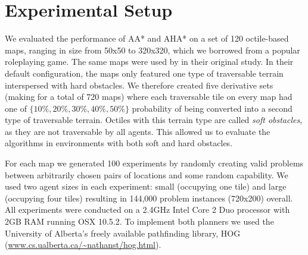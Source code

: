 \section{Experimental Setup}
We evaluated the performance of AA* and AHA* on a set of 120 octile-based maps, ranging in size from 50x50 to 320x320, which we borrowed from a popular roleplaying game.
The same maps were used by \cite{botea04} in their original study.
In their default configuration, the maps only featured one type of traversable terrain interspersed with hard obstacles. 
We therefore created five derivative sets (making for a total of 720 maps) where each traversable tile on every map had one of $\lbrace 10\%, 20\%, 30\%, 40\%, 50\% \rbrace$ probability of being converted into a second type of traversable terrain. Octiles with this terrain type are called \emph{soft obstacles}, as they are not traversable by all agents.
This allowed us to evaluate the algorithms in environments with both soft and hard obstacles.
\par \indent
For each map we generated 100 experiments by randomly creating valid problems between arbitrarily chosen pairs of locations and some random capability.
We used two agent sizes in each experiment: small (occupying one tile) and large (occupying four tiles) resulting in 144,000 problem instances (720x200) overall.
All experiments were conducted on a 2.4GHz Intel Core 2 Duo processor with 2GB RAM running OSX 10.5.2.
To implement both planners we used the University of Alberta's freely available pathfinding library, HOG (\url{www.cs.ualberta.ca/~nathanst/hog.html}). 

